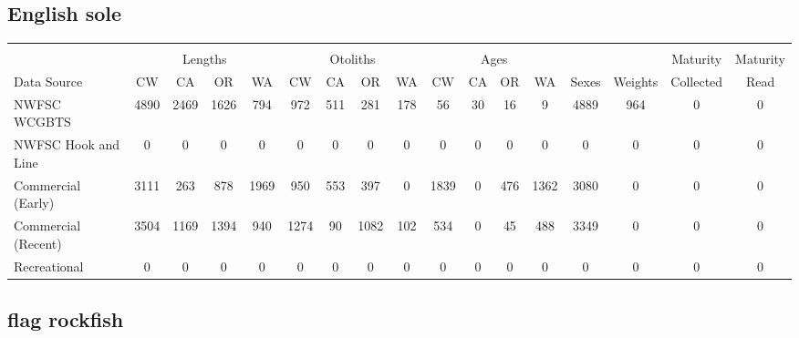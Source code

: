 \documentclass[12pt,]{article}
\begin{document}
\FloatBarrier  

\subsection{English sole}\label{english-sole}

\begin{table}[ht]
\centering
\begingroup\fontsize{10pt}{10pt}\selectfont
\begin{tabular}{|l|cccc|cccc|cccc|c|c|c|c|}
  \hline
 &  &  &  &  &  &  &  &  &  &  &  &  &  &  &  &  \\ 
   & \multicolumn{4}{c}{Lengths} &  \multicolumn{4}{c}{Otoliths} & \multicolumn{4}{c}{Ages} &  & & Maturity & Maturity\\
 Data Source & CW & CA & OR & WA & CW & CA & OR & WA & CW & CA & OR & WA & Sexes & Weights & Collected & Read\\
 \hline
NWFSC WCGBTS & 4890 & 2469 & 1626 & 794 & 972 & 511 & 281 & 178 & 56 & 30 & 16 & 9 & 4889 & 964 & 0 & 0 \\ 
  NWFSC Hook and Line & 0 & 0 & 0 & 0 & 0 & 0 & 0 & 0 & 0 & 0 & 0 & 0 & 0 & 0 & 0 & 0 \\ 
  Commercial (Early) & 3111 & 263 & 878 & 1969 & 950 & 553 & 397 & 0 & 1839 & 0 & 476 & 1362 & 3080 & 0 & 0 & 0 \\ 
  Commercial (Recent) & 3504 & 1169 & 1394 & 940 & 1274 & 90 & 1082 & 102 & 534 & 0 & 45 & 488 & 3349 & 0 & 0 & 0 \\ 
  Recreational & 0 & 0 & 0 & 0 & 0 & 0 & 0 & 0 & 0 & 0 & 0 & 0 & 0 & 0 & 0 & 0 \\ 
   \hline
\end{tabular}
\endgroup
\end{table}

\FloatBarrier  

\subsection{flag rockfish}\label{flag-rockfish}
\end{document}
